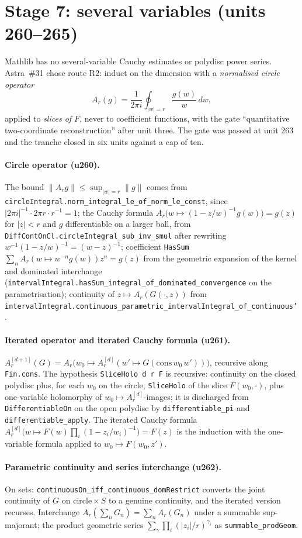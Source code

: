 \documentclass[11pt]{article}
\begin{document}
\section{Stage 7: several variables (units 260--265)}
Mathlib has no several-variable Cauchy estimates or polydisc power series. Astra~\#31 chose route R2:
induct on the dimension with a \emph{normalised circle operator}
\[
A_r(g)=\frac1{2\pi i}\oint_{|w|=r}\frac{g(w)}{w}\,dw,
\]
applied to \emph{slices of $F$}, never to coefficient functions, with the gate ``quantitative
two-coordinate reconstruction'' after unit three. The gate was passed at unit 263 and the tranche closed
in six units against a cap of ten.
\paragraph{Circle operator (u260).} The bound $\|A_rg\|\le\sup_{|w|=r}\|g\|$ comes from
\texttt{circleIntegral.norm\_integral\_le\_of\_norm\_le\_const}, since $|2\pi i|^{-1}\cdot2\pi r\cdot r^{-1}=1$;
the Cauchy formula $A_r\bigl(w\mapsto(1-z/w)^{-1}g(w)\bigr)=g(z)$ for $|z|<r$ and $g$ differentiable on a
larger ball, from \texttt{DiffContOnCl.circleIntegral\_sub\_inv\_smul} after rewriting
$w^{-1}(1-z/w)^{-1}=(w-z)^{-1}$; coefficient \texttt{HasSum} $\sum_n A_r(w\mapsto w^{-n}g(w))z^n=g(z)$ from
the geometric expansion of the kernel and dominated interchange
(\texttt{intervalIntegral.hasSum\_integral\_of\_dominated\_convergence} on the parametrisation);
continuity of $z\mapsto A_r(G(\cdot,z))$ from
\texttt{intervalIntegral.continuous\_parametric\_intervalIntegral\_of\_continuous'}.
\paragraph{Iterated operator and iterated Cauchy formula (u261).} $A_r^{[d+1]}(G)=A_r\bigl(w_0\mapsto
A_r^{[d]}(w'\mapsto G(\mathrm{cons}\,w_0\,w'))\bigr)$, recursive along \texttt{Fin.cons}. The hypothesis
\texttt{SliceHolo d r F} is recursive: continuity on the closed polydisc plus, for each $w_0$ on the circle,
\texttt{SliceHolo} of the slice $F(w_0,\cdot)$, plus one-variable holomorphy of $w_0\mapsto A_r^{[d]}$-images;
it is discharged from \texttt{DifferentiableOn} on the open polydisc by \texttt{differentiable\_pi} and
\texttt{differentiable\_apply}. The iterated Cauchy formula
$A_r^{[d]}\bigl(w\mapsto F(w)\prod_i(1-z_i/w_i)^{-1}\bigr)=F(z)$ is the induction with the one-variable
formula applied to $w_0\mapsto F(w_0,z')$.
\paragraph{Parametric continuity and series interchange (u262).} On sets:
\texttt{continuousOn\_iff\_continuous\_domRestrict} converts the joint continuity of $G$ on
$\text{circle}\times S$ to a genuine continuity, and the iterated version recurses. Interchange
$A_r(\sum_nG_n)=\sum_nA_r(G_n)$ under a summable sup-majorant; the product geometric series
$\sum_\gamma\prod_i(|z_i|/r)^{\gamma_i}$ as \texttt{summable\_prodGeom}.
\end{document}
